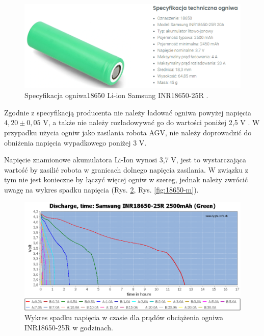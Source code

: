 \documentclass{report}
\begin{document}
\begin{enumerate}[label=(\Alph*)]
    \begin{figure}[H]
        \centering
        \includegraphics{src/tech_specifications/Li-ion Samsung INR18650-25R .png}
        \caption{Specyfikacja ogniwa18650 Li-ion Samsung INR18650-25R \cite{18650Spec}.}
        \label{fig:spec-18650}
    \end{figure}

    Zgodnie z specyfikacją producenta nie należy ładować ogniwa powyżej napięcia $4,20 \pm 0,05$ V, a także nie należy rozładowywać go do wartości poniżej 2,5 V \cite{18650Charts}. W przypadku użycia ogniw jako zasilania robota AGV, nie należy doprowadzić do obniżenia napięcia wypadkowego poniżej 3 V.
    
    Napięcie znamionowe akumulatora Li-Ion wynosi 3,7 V, jest to wystarczająca wartość by zasilić robota w granicach dolnego napięcia zasilania. W związku z tym nie jest konieczne by łączyć więcej ogniw w szereg, jednak należy zwrócić uwagę na wykres spadku napięcia (Rys. \ref{fig:18650-h}, Rys. \ref{fig:18650-m}).

    \begin{figure}[H]
        \centering
        \includegraphics{src/cells_charts/Li-ion discharge hours.png}
        \caption{Wykres spadku napięcia w czasie dla prądów obciążenia ogniwa INR18650-25R w godzinach. \cite{18650Charts}}
        \label{fig:18650-h}
    \end{figure}


\end{enumerate}
\end{document}
